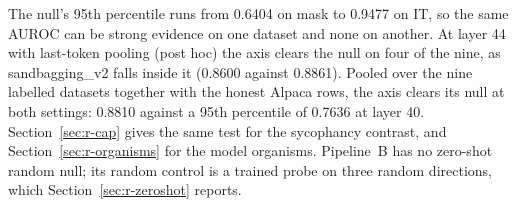 The null's 95th percentile runs from 0.6404 on mask to 0.9477 on IT, so the same AUROC can be strong evidence on one dataset and none on another. %
At layer 44 with last-token pooling (post hoc) the axis clears the null on four of the nine, as sandbagging\_v2 falls inside it (0.8600 against 0.8861). %
Pooled over the nine labelled datasets together with the honest Alpaca rows, the axis clears its null at both settings: 0.8810 against a 95th percentile of 0.7636 at layer 40. %
Section~\ref{sec:r-cap} gives the same test for the sycophancy contrast, and Section~\ref{sec:r-organisms} for the model organisms.
Pipeline~B has no zero-shot random null; its random control is a trained probe on three random directions, which Section~\ref{sec:r-zeroshot} reports. %

